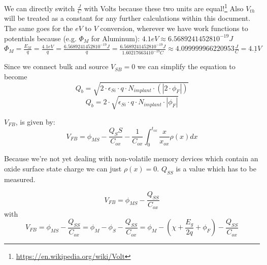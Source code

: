 \begin{mdframed}[linewidth=2pt,linecolor=red]
We can directly switch $\frac{J}{C}$ with Volts because these two units are equal!\footnote{\url{https://en.wikipedia.org/wiki/Volt}}
Also $V_{th}$ will be treated as a constant for any further calculations within this document.\\

The same goes for the $eV$ to $V$ conversion, wherever we have work functions to potentials because (e.g. $\Phi_M$ for Aluminum):
$4.1 eV \approx 6.56892414528 10^{-19}J$ \\
$\Phi_M=\frac{E_M}{q}=\frac{4.1 eV}{q}=\frac{6.56892414528 10^{-19} J}{q} = \frac{6.56892414528 10^{-19} J}{1.602176634 10^{-19} C} \approx 4.099999966220953 \frac{J}{C} = \underline{4.1V}$ \\
\end{mdframed}

Since we connect bulk and source $V_{SB}=0$ we can simplify the equation to become
\begin{equation}
Q_b
=
\sqrt{2\cdot\epsilon_{Si}\cdot q\cdot N_{implant} \cdot  ( \left| 2 \cdot \phi_F \right|) }
\end{equation}
\begin{equation}
Q_b
=
2\cdot\sqrt{\epsilon_{Si}\cdot q\cdot N_{implant}\cdot \left| \phi_F \right| }
\end{equation}


$V_{FB}$, is given by:
\begin{equation}
V_{FB}
=
\phi_{MS}-\frac{Q_SS}{C_{ox}}-\frac{1}{C_{ox}}\int_{0}^{t_{ox}}\frac{x}{x_{ox}}\rho(x) dx
\end{equation}

Because we're not yet dealing with non-volatile memory devices which contain an oxide surface state charge we can just $\rho(x)=0$.
$Q_{SS}$ is a value which has to be measured.

\begin{equation}
V_{FB}
=
\phi_{MS} - \frac{Q_{SS}}{C_{ox}}
\end{equation}
with
\begin{equation}
V_{FB}
=
\phi_{MS} - \frac{Q_{SS}}{C_{ox}}
=
\phi_{M} - \phi_{S} - \frac{Q_{SS}}{C_{ox}}
=
\phi_{M} -  \left(\chi + \frac{E_g}{2 q} + \phi_F \right) - \frac{Q_{SS}}{C_{ox}}
\end{equation}

